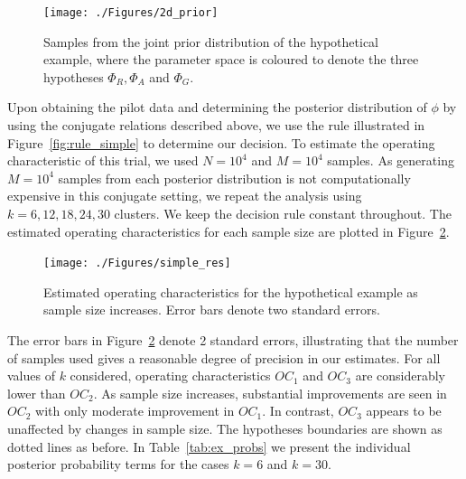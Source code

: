 \documentclass{article} %
\begin{document}
\begin{figure}
\centering
\texttt{[image: ./Figures/2d\_prior]}
\caption{Samples from the joint prior distribution of the hypothetical example, where the parameter space is coloured to denote the three hypotheses $\Phi_{R}, \Phi_{A}$ and $\Phi_{G}$.}
\label{fig:2d_prior}
\end{figure}

Upon obtaining the pilot data and determining the posterior distribution of $\phi$ by using the conjugate relations described above, we use the rule illustrated in Figure~\ref{fig:rule_simple} to determine our decision. To estimate the operating characteristic of this trial, we used $N = 10^4$ and $M = 10^4$ samples. As generating $M = 10^4$ samples from each posterior distribution is not computationally expensive in this conjugate setting, we repeat the analysis using $k = 6, 12, 18, 24, 30$ clusters. We keep the decision rule constant throughout. The estimated operating characteristics for each sample size are plotted in Figure~\ref{fig:simple_res}.

\begin{figure}
\centering
\texttt{[image: ./Figures/simple\_res]}
\caption{Estimated operating characteristics for the hypothetical example as sample size increases. Error bars denote two standard errors.}
\label{fig:simple_res}
\end{figure}

The error bars in Figure~\ref{fig:simple_res} denote 2 standard errors, illustrating that the number of samples used gives a reasonable degree of precision in our estimates. For all values of $k$ considered, operating characteristics $OC_{1}$ and $OC_{3}$ are considerably lower than $OC_{2}$. As sample size increases, substantial improvements are seen in $OC_{2}$ with only moderate improvement in $OC_{1}$. In contrast, $OC_{3}$ appears to be unaffected by changes in sample size. The hypotheses boundaries are shown as dotted lines as before. In Table~\ref{tab:ex_probs} we present the individual posterior probability terms for the cases  $k = 6$ and $k = 30$.


\end{document}
